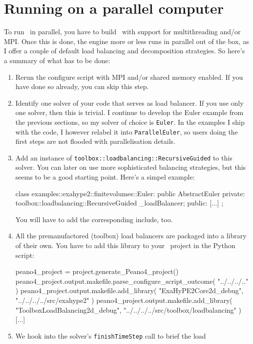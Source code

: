 \section{Running on a parallel computer}

To run \ExaHyPE\ in parallel, you have to build \Peano\ with support for
multithreading and/or MPI.
Once this is done, the engine more or less runs in parallel out of the box, as I
offer a couple of default load balancing and decomposition strategies. 
So here's a summary of what has to be done:



\begin{enumerate}
  \item Rerun the configure script with MPI and/or shared memory enabled. If you
  have done so already, you can skip this step.
  \item Identify one solver of your code that serves as load balancer. If you
  use only one solver, then this is trivial. I continue to develop the Euler
  example from the previous sections, so my solver of choice is \texttt{Euler}.
  In the examples I ship with the code, I however relabel it into
  \texttt{ParallelEuler}, so users doing the first steps are not flooded with
  parallelisation details.
  \item Add an instance of \texttt{toolbox::loadbalancing::RecursiveGuided} to
  this solver. You can later on use more sophisticated balancing strategies, but
  this seems to be a good starting point. Here's a simpel example:
  \begin{code}
class examples::exahype2::finitevolumes::Euler: public AbstractEuler {
  private:
    toolbox::loadbalancing::RecursiveGuided  _loadBalancer;
  public:
    [...]
};
  \end{code}
    You will have to add the corresponding include, too.
  \item All the premanufactored (toolbox) load balancers are packaged into a
  library of their own. You have to add this library to your \Peano\ project in
  the Python script:
  \begin{code}
peano4_project = project.generate_Peano4_project()
peano4_project.output.makefile.parse_configure_script_outcome( "../../../.." )
peano4_project.output.makefile.add_library( "ExaHyPE2Core2d_debug", "../../../../src/exahype2" )
peano4_project.output.makefile.add_library( 
  "ToolboxLoadBalancing2d_debug", "../../../../src/toolbox/loadbalancing" )
[...]
  \end{code}
  \item We hook into the solver's \texttt{finishTimeStep} call to brief the load

\end{enumerate}
